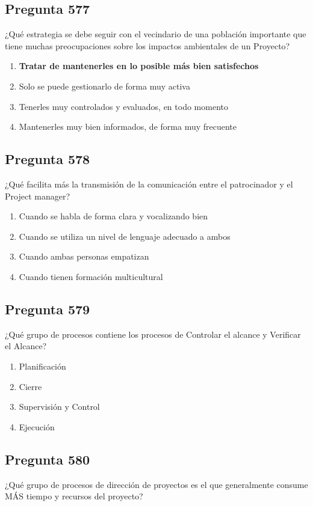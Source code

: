 \documentclass[11pt,a4paper]{article}
\begin{document}
\subsection*{Pregunta 577}
¿Qué estrategia se debe seguir con el vecindario de una población importante que tiene muchas preocupaciones sobre los impactos ambientales de un Proyecto?

\begin{enumerate}[label=\alph*)]
  \item \textbf{Tratar de mantenerles en lo posible más bien satisfechos}
  \item Solo se puede gestionarlo de forma muy activa
  \item Tenerles muy controlados y evaluados, en todo momento
  \item Mantenerles muy bien informados, de forma muy frecuente
\end{enumerate}

\subsection*{Pregunta 578}
¿Qué facilita más la transmisión de la comunicación entre el patrocinador y el Project manager?

\begin{enumerate}[label=\alph*)]
  \item Cuando se habla de forma clara y vocalizando bien
  \item Cuando se utiliza un nivel de lenguaje adecuado a ambos
  \item Cuando ambas personas empatizan
  \item Cuando tienen formación multicultural
\end{enumerate}

\subsection*{Pregunta 579}
¿Qué grupo de procesos contiene los procesos de Controlar el alcance y Verificar el Alcance?

\begin{enumerate}[label=\alph*)]
  \item Planificación
  \item Cierre
  \item Supervisión y Control
  \item Ejecución
\end{enumerate}

\subsection*{Pregunta 580}
¿Qué grupo de procesos de dirección de proyectos es el que generalmente consume MÁS tiempo y recursos del proyecto?
\end{document}

